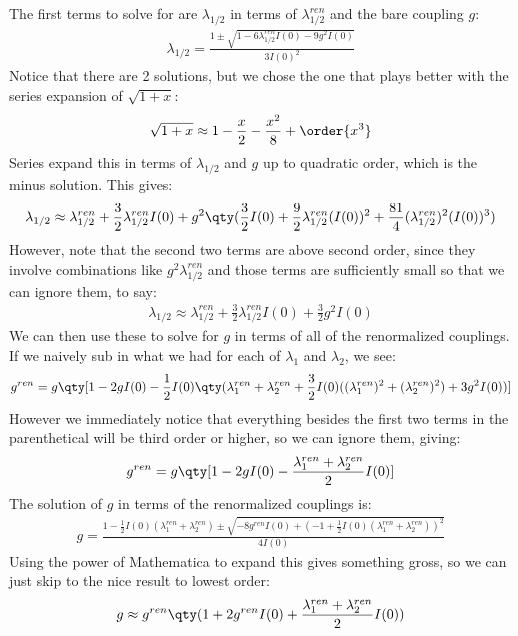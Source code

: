 \documentclass[12pt]{article}
\begin{document}
The first terms to solve for are $\lambda_{1/2}$ in terms of $\lambda_{1/2}^{ren}$ and the bare coupling $g$:
\begin{align*}
  \lambda_{1/2}=\frac{1\pm\sqrt{1-6\lambda_{1/2}^{ren}I(0)-9g^2I(0)}}{3I(0)^2}
\end{align*}
Notice that there are 2 solutions, but we chose the one that plays better with the series expansion of $\sqrt{1+x}$:
\begin{align*}
  \sqrt{1+x}\approx1-\frac{x}{2}-\frac{x^2}{8}+\order{x^3}
\end{align*}
Series expand this in terms of $\lambda_{1/2}$ and $g$ up to quadratic order, which is the minus solution. This gives:
\begin{align*}
  \lambda_{1/2}\approx\lambda_{1/2}^{ren}+\frac32\lambda_{1/2}^{ren}I(0)
  +g^2\qty(\frac32I(0)+\frac92\lambda_{1/2}^{ren}(I(0))^2
  +\frac{81}4(\lambda_{1/2}^{ren})^2(I(0))^3)
\end{align*}
However, note that the second two terms are above second order, since they involve combinations like $g^2\lambda_{1/2}^{ren}$ and those terms are sufficiently small so that we can ignore them, to say:
\begin{align*}
  \lambda_{1/2}\approx\lambda_{1/2}^{ren}
  +\frac32\lambda_{1/2}^{ren}I(0)
  +\frac32g^2I(0)
\end{align*}
We can then use these to solve for $g$ in terms of all of the renormalized couplings. If we naively sub in what we had for each of $\lambda_1$ and $\lambda_2$, we see:
\begin{align*}
  g^{ren}=g\qty[1-2g I(0)-\frac12I(0)
  \qty(\lambda^{ren}_1+\lambda^{ren}_2
  +\frac32I(0)((\lambda_1^{ren})^2+(\lambda_2^{ren})^2)+3g^2I(0))]
\end{align*}
However we immediately notice that everything besides the first two terms in the parenthetical will be third order or higher, so we can ignore them, giving:
\begin{align*}
  g^{ren}=g\qty[1-2g I(0)-\frac{\lambda^{ren}_1+\lambda^{ren}_2}2I(0)]
\end{align*}
The solution of $g$ in terms of the renormalized couplings is:
\begin{align*}
  g=\frac{1-\frac12I(0)(\lambda_1^{ren}+\lambda_2^{ren})\pm
    \sqrt{-8g^{ren}I(0)+(-1+\frac12I(0)(\lambda_1^{ren}+\lambda_2^{ren}))^2}}
  {4I(0)}
\end{align*}
Using the power of Mathematica to expand this gives something gross, so we can just skip to the nice result to lowest order:
\begin{align*}
  g\approx g^{ren}\qty(1+2g^{ren}I(0)+
  \frac{\lambda_1^{ren}+\lambda_2^{ren}}2I(0))
\end{align*}
\end{document}
